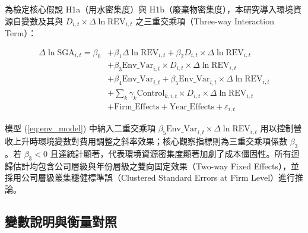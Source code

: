 \documentclass[12pt,a4paper]{article}
\begin{document}
為檢定核心假說 H1a（用水密集度）與 H1b（廢棄物密集度），本研究導入環境資源自變數及其與 $D_{i,t} \times \Delta\ln\text{REV}_{i,t}$ 之三重交乘項（Three-way Interaction Term）：

\begin{equation}
\label{eq:env_model}
\begin{aligned}
\Delta\ln\text{SGA}_{i,t} = \beta_0 &+ \beta_1 \Delta\ln\text{REV}_{i,t} + \beta_2 D_{i,t} \times \Delta\ln\text{REV}_{i,t} \\
&+ \beta_3 \text{Env\_Var}_{i,t} \times D_{i,t} \times \Delta\ln\text{REV}_{i,t} \\
&+ \beta_4 \text{Env\_Var}_{i,t} + \beta_5 \text{Env\_Var}_{i,t} \times \Delta\ln\text{REV}_{i,t} \\
&+ \sum_k \gamma_k \text{Control}_{k,i,t} \times D_{i,t} \times \Delta\ln\text{REV}_{i,t} \\
&+ \text{Firm\_Effects} + \text{Year\_Effects} + \varepsilon_{i,t}
\end{aligned}
\end{equation}

模型 (\ref{eq:env_model}) 中納入二重交乘項 $\beta_5 \text{Env\_Var}_{i,t} \times \Delta\ln\text{REV}_{i,t}$ 用以控制營收上升時環境變數對費用調整之斜率效果；核心觀察指標則為三重交乘項係數 $\beta_3$。若 $\beta_3 < 0$ 且達統計顯著，代表環境資源密集度顯著加劇了成本僵固性。所有迴歸估計均包含公司層級與年份層級之雙向固定效果（Two-way Fixed Effects），並採用公司層級叢集穩健標準誤（Clustered Standard Errors at Firm Level）進行推論。

\subsection{變數說明與衡量對照}
\end{document}

